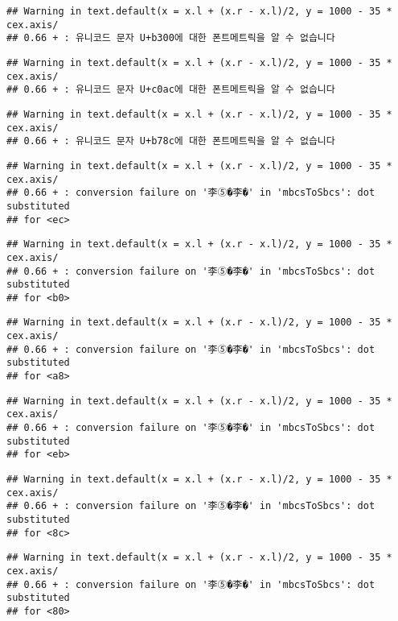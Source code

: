\documentclass[]{article}
\begin{document}
\begin{verbatim}
## Warning in text.default(x = x.l + (x.r - x.l)/2, y = 1000 - 35 * cex.axis/
## 0.66 + : 유니코드 문자 U+b300에 대한 폰트메트릭을 알 수 없습니다
\end{verbatim}

\begin{verbatim}
## Warning in text.default(x = x.l + (x.r - x.l)/2, y = 1000 - 35 * cex.axis/
## 0.66 + : 유니코드 문자 U+c0ac에 대한 폰트메트릭을 알 수 없습니다
\end{verbatim}

\begin{verbatim}
## Warning in text.default(x = x.l + (x.r - x.l)/2, y = 1000 - 35 * cex.axis/
## 0.66 + : 유니코드 문자 U+b78c에 대한 폰트메트릭을 알 수 없습니다
\end{verbatim}

\begin{verbatim}
## Warning in text.default(x = x.l + (x.r - x.l)/2, y = 1000 - 35 * cex.axis/
## 0.66 + : conversion failure on '李⑤�李�' in 'mbcsToSbcs': dot substituted
## for <ec>
\end{verbatim}

\begin{verbatim}
## Warning in text.default(x = x.l + (x.r - x.l)/2, y = 1000 - 35 * cex.axis/
## 0.66 + : conversion failure on '李⑤�李�' in 'mbcsToSbcs': dot substituted
## for <b0>
\end{verbatim}

\begin{verbatim}
## Warning in text.default(x = x.l + (x.r - x.l)/2, y = 1000 - 35 * cex.axis/
## 0.66 + : conversion failure on '李⑤�李�' in 'mbcsToSbcs': dot substituted
## for <a8>
\end{verbatim}

\begin{verbatim}
## Warning in text.default(x = x.l + (x.r - x.l)/2, y = 1000 - 35 * cex.axis/
## 0.66 + : conversion failure on '李⑤�李�' in 'mbcsToSbcs': dot substituted
## for <eb>
\end{verbatim}

\begin{verbatim}
## Warning in text.default(x = x.l + (x.r - x.l)/2, y = 1000 - 35 * cex.axis/
## 0.66 + : conversion failure on '李⑤�李�' in 'mbcsToSbcs': dot substituted
## for <8c>
\end{verbatim}

\begin{verbatim}
## Warning in text.default(x = x.l + (x.r - x.l)/2, y = 1000 - 35 * cex.axis/
## 0.66 + : conversion failure on '李⑤�李�' in 'mbcsToSbcs': dot substituted
## for <80>
\end{verbatim}
\end{document}

